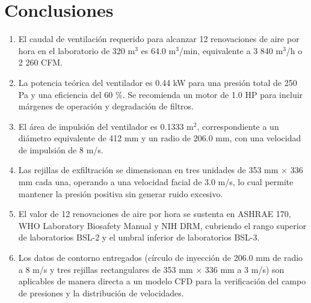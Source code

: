 \section{Conclusiones}

\begin{enumerate}
	\item El caudal de ventilación requerido para alcanzar 12 renovaciones de aire por hora en el laboratorio de 320 m$^3$ es 64.0 m$^3$/min, equivalente a 3 840 m$^3$/h o 2 260 CFM.
	\item La potencia teórica del ventilador es 0.44 kW para una presión total de 250 Pa y una eficiencia del 60 \%. Se recomienda un motor de 1.0 HP para incluir márgenes de operación y degradación de filtros.
	\item El área de impulsión del ventilador es 0.1333 m$^2$, correspondiente a un diámetro equivalente de 412 mm y un radio de 206.0 mm, con una velocidad de impulsión de 8 m/s.
	\item Las rejillas de exfiltración se dimensionan en tres unidades de 353 mm $\times$ 336 mm cada una, operando a una velocidad facial de 3.0 m/s, lo cual permite mantener la presión positiva sin generar ruido excesivo.
	\item El valor de 12 renovaciones de aire por hora se sustenta en ASHRAE 170, WHO Laboratory Biosafety Manual y NIH DRM, cubriendo el rango superior de laboratorios BSL-2 y el umbral inferior de laboratorios BSL-3.
	\item Los datos de contorno entregados (círculo de inyección de 206.0 mm de radio a 8 m/s y tres rejillas rectangulares de 353 mm $\times$ 336 mm a 3 m/s) son aplicables de manera directa a un modelo CFD para la verificación del campo de presiones y la distribución de velocidades.
\end{enumerate}
